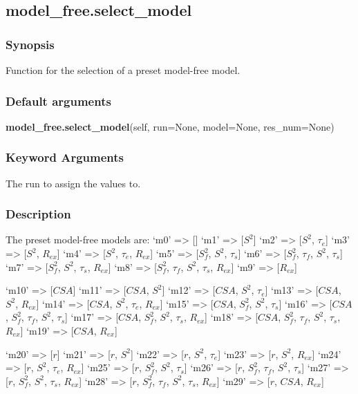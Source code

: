 \newpage

\subsection{model\_free.select\_model}


\subsubsection{Synopsis}

Function for the selection of a preset model-free model.

\subsubsection{Default arguments}

\textsf{\textbf{model\_free.select\_model}(self, run=None, model=None, res\_num=None)}


\subsubsection{Keyword Arguments}

  The run to assign the values to.


\subsubsection{Description}

The preset model-free models are:
    `m0'    => []
    `m1'    => [$S^2$]
    `m2'    => [$S^2$, $\tau_e$]
    `m3'    => [$S^2$, $R_{ex}$]
    `m4'    => [$S^2$, $\tau_e$, $R_{ex}$]
    `m5'    => [$S^2_f$, $S^2$, $\tau_s$]
    `m6'    => [$S^2_f$, $\tau_f$, $S^2$, $\tau_s$]
    `m7'    => [$S^2_f$, $S^2$, $\tau_s$, $R_{ex}$]
    `m8'    => [$S^2_f$, $\tau_f$, $S^2$, $\tau_s$, $R_{ex}$]
    `m9'    => [$R_{ex}$]

    `m10'   => [$CSA$]
    `m11'   => [$CSA$, $S^2$]
    `m12'   => [$CSA$, $S^2$, $\tau_e$]
    `m13'   => [$CSA$, $S^2$, $R_{ex}$]
    `m14'   => [$CSA$, $S^2$, $\tau_e$, $R_{ex}$]
    `m15'   => [$CSA$, $S^2_f$, $S^2$, $\tau_s$]
    `m16'   => [$CSA$, $S^2_f$, $\tau_f$, $S^2$, $\tau_s$]
    `m17'   => [$CSA$, $S^2_f$, $S^2$, $\tau_s$, $R_{ex}$]
    `m18'   => [$CSA$, $S^2_f$, $\tau_f$, $S^2$, $\tau_s$, $R_{ex}$]
    `m19'   => [$CSA$, $R_{ex}$]

    `m20'   => [$r$]
    `m21'   => [$r$, $S^2$]
    `m22'   => [$r$, $S^2$, $\tau_e$]
    `m23'   => [$r$, $S^2$, $R_{ex}$]
    `m24'   => [$r$, $S^2$, $\tau_e$, $R_{ex}$]
    `m25'   => [$r$, $S^2_f$, $S^2$, $\tau_s$]
    `m26'   => [$r$, $S^2_f$, $\tau_f$, $S^2$, $\tau_s$]
    `m27'   => [$r$, $S^2_f$, $S^2$, $\tau_s$, $R_{ex}$]
    `m28'   => [$r$, $S^2_f$, $\tau_f$, $S^2$, $\tau_s$, $R_{ex}$]
    `m29'   => [$r$, $CSA$, $R_{ex}$]


